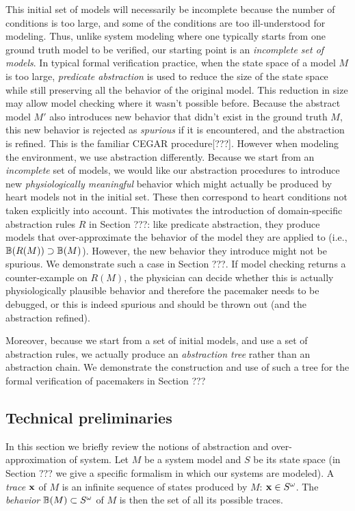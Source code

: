This initial set of models will necessarily be incomplete because the number of conditions is too large, and some of the conditions are too ill-understood for modeling.
Thus, unlike system modeling where one typically starts from one ground truth model to be verified, our starting point is an \emph{incomplete set of models}.
In typical formal verification practice, when the state space of a model $M$ is too large, \emph{predicate abstraction} is used to reduce the size of the state space while still preserving all the behavior of the original model. 
This reduction in size may allow model checking where it wasn't possible before. 
Because the abstract model $M'$ also introduces new behavior that didn't exist in the ground truth $M$, this new behavior is rejected as \emph{spurious} if it is encountered, and the abstraction is refined.
This is the familiar CEGAR procedure[???].
However when modeling the environment, we use abstraction differently. 
Because we start from an \emph{incomplete} set of models, we would like our abstraction procedures to introduce new \emph{physiologically meaningful} behavior which might actually be produced by heart models not in the initial set.
These then correspond to heart conditions not taken explicitly into account. 
This motivates the introduction of domain-specific abstraction rules $R$ in Section ???: like predicate abstraction, they produce models that over-approximate the behavior of the model they are applied to (i.e., $\mathbb{B}(R(M)) \supset \mathbb{B}(M)$).
However, the new behavior they introduce might not be spurious. 
We demonstrate such a case in Section ???.
If model checking returns a counter-example on $R(M)$, the physician can decide whether this is actually physiologically plausible behavior and therefore the pacemaker needs to be debugged, or this is indeed spurious and should be thrown out (and the abstraction refined).

Moreover, because we start from a set of initial models, and use a set of abstraction rules, we actually produce an \emph{abstraction tree} rather than an abstraction chain.
We demonstrate the construction and use of such a tree for the formal verification of pacemakers in Section ???

\subsection{Technical preliminaries}
In this section we briefly review the notions of abstraction and over-approximation of system.
Let $M$ be a system model and $S$ be its state space (in Section ??? we give a specific formalism in which our systems are modeled).
A \emph{trace} $\mathbf{x}$ of $M$ is an infinite sequence of states produced by $M$: $\mathbf{x} \in S^\omega$.
The \emph{behavior} $\mathbb{B}(M) \subset S^\omega$ of $M$ is then the set of all its possible traces.

